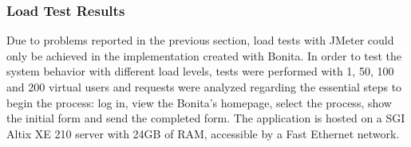 \documentclass[runningheads,a4paper]{llncs}
\begin{document}
\subsubsection{Load Test Results}

Due to problems reported in the previous section, load tests with JMeter could only be achieved in the implementation created with Bonita. In order to test the system behavior with different load levels, tests were performed with 1, 50, 100 and 200 virtual users and requests were analyzed regarding the essential steps to begin the process: log in, view the Bonita's homepage, select the process, show the initial form and send the completed form. The application is hosted on a SGI Altix XE 210 server with 24GB of RAM, accessible by a Fast Ethernet network.


\end{document}
